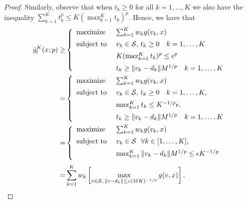 \documentclass[12pt]{article}
\theoremstyle{thmstyleone}%
\theoremstyle{thmstyletwo}%
\theoremstyle{thmstylethree}%
\begin{document}
\begin{appendices}
\begin{proof}
  Similarly, observe that when $t_k\geq 0$ for all $k = 1,\dots, K$ we also have the inequality $\sum_{k=1}^K t_k^p \leq K (\max_{k=1}^K t_k)^p$. Hence, we have that
  \begin{align*}
    \bar{g}^K_l(x; p)
    \geq &
    \left\{
      \begin{array}{l@{~~~~}l}
				\mbox{maximize} & \sum_{k=1}^K w_k g(v_k, x) \\[0.5em]
        \mbox{subject to} & v_k\in \supp, \, t_k\geq 0 \quad k = 1,\dots,K\\[0.5em]
             &  K (\max_{k=1}^K t_k)^p \leq \epsilon^p\\[0.5em]
             &  t_k\geq \norm{v_k-d_k} M^{1/p} \quad k = 1,\dots,K
      \end{array}
           \right.\\
    = &
    \left\{
      \begin{array}{l@{~~~~}l}
				\mbox{maximize} & \sum_{k=1}^K w_k g(v_k, x) \\[0.5em]
        \mbox{subject to} & v_k\in \supp, \, t_k\geq 0 \quad k = 1,\dots,K,\\[0.5em]
             &   \max_{k=1}^K t_k \leq K^{-1/p} \epsilon,\\[0.5em]
             &  t_k\geq \norm{v_k-d_k} M^{1/p} \quad k = 1,\dots,K
      \end{array}
               \right.\\
    = &    \left\{
      \begin{array}{l@{~~~~}l}
				\mbox{maximize} & \sum_{k=1}^K w_k g(v_k, x) \\[0.5em]
        \mbox{subject to} & v_k\in \supp~~\forall k \in [1,\dots,K],\\[0.5em]
             &  \max_{k=1}^K \norm{v_k-d_k} M^{1/p} \leq \epsilon K^{-1/p}\\[0.5em]
      \end{array}
        \right.\\
    = &  \sum_{k=1}^K w_k \left[\max_{v\in \supp,\,\norm{v-d_k}\leq \epsilon (MK)^{-1/p}} g(v, x)\right].
  \end{align*}


\end{proof}
\end{appendices}
\end{document}
